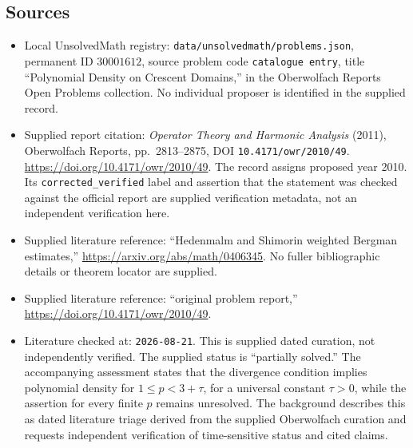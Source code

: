 \documentclass[11pt]{article}
\begin{document}
\subsection{Sources}
\begin{itemize}
\item Local UnsolvedMath registry: \texttt{data/unsolvedmath/problems.json}, permanent ID \(30001612\), source problem code \texttt{catalogue entry}, title ``Polynomial Density on Crescent Domains,'' in the Oberwolfach Reports Open Problems collection. No individual proposer is identified in the supplied record.
\item Supplied report citation: \emph{Operator Theory and Harmonic Analysis} (2011), Oberwolfach Reports, pp.~2813--2875, DOI \texttt{10.4171/owr/2010/49}. \url{https://doi.org/10.4171/owr/2010/49}. The record assigns proposed year 2010. Its \texttt{corrected\_verified} label and assertion that the statement was checked against the official report are supplied verification metadata, not an independent verification here.
\item Supplied literature reference: ``Hedenmalm and Shimorin weighted Bergman estimates,'' \url{https://arxiv.org/abs/math/0406345}. No fuller bibliographic details or theorem locator are supplied.
\item Supplied literature reference: ``original problem report,'' \url{https://doi.org/10.4171/owr/2010/49}.
\item Literature checked at: \texttt{2026-08-21}. This is supplied dated curation, not independently verified. The supplied status is ``partially solved.'' The accompanying assessment states that the divergence condition implies polynomial density for \(1\leq p<3+\tau\), for a universal constant \(\tau>0\), while the assertion for every finite \(p\) remains unresolved. The background describes this as dated literature triage derived from the supplied Oberwolfach curation and requests independent verification of time-sensitive status and cited claims.
\end{itemize}
\end{document}
